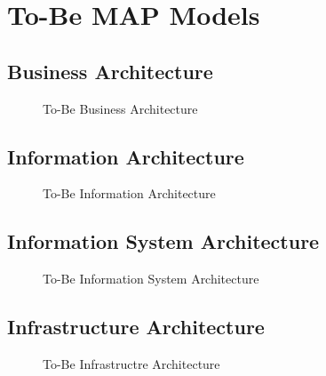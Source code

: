 \section{To-Be MAP Models}
\label{sec:to_be_map_model}
\subsection{Business Architecture}
\begin{center}
	\begin{figure}[H]
		\centering
		\setlength\fboxsep{7pt}
		\setlength\fboxrule{0.5pt}
		\caption{To-Be Business Architecture}
		\label{fig:map_business_to_be}
	\end{figure}
\end{center}
%
\vspace{-5cm}
\subsection{Information Architecture}
\begin{center}
	\begin{figure}[H]
		\centering
		\setlength\fboxsep{7pt}
		\setlength\fboxrule{0.5pt}
		\caption{To-Be Information Architecture}
		\label{fig:map_application_to_be}
	\end{figure}
\end{center}
%
\subsection{Information System Architecture}
\begin{center}
	\begin{figure}[H]
		\centering
		\setlength\fboxsep{7pt}
		\setlength\fboxrule{0.5pt}
		\caption{To-Be Information System Architecture}
		\label{fig:map_information_to_be}
	\end{figure}
\end{center}
%
\subsection{Infrastructure Architecture}
\begin{center}
	\begin{figure}[H]
		\centering
		\setlength\fboxsep{7pt}
		\setlength\fboxrule{0.5pt}
		\caption{To-Be Infrastructre Architecture}
		\label{fig:map_information_to_be}
	\end{figure}
\end{center}